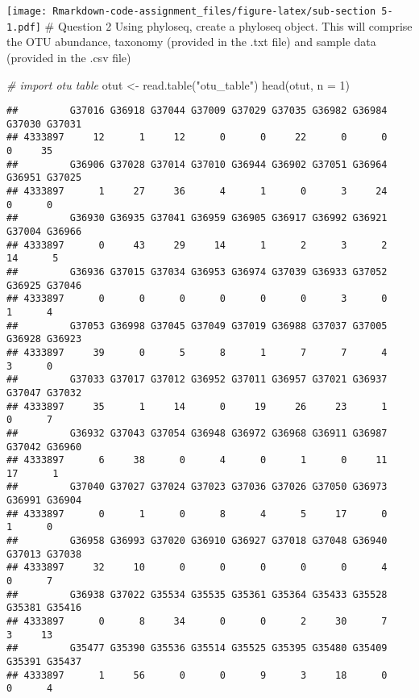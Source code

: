 \documentclass[
]{article}
\newenvironment{Shaded}{\begin{snugshade}}{\end{snugshade}}
\newcommand{\AttributeTok}[1]{\textcolor[rgb]{0.77,0.63,0.00}{#1}}
\newcommand{\CommentTok}[1]{\textcolor[rgb]{0.56,0.35,0.01}{\textit{#1}}}
\newcommand{\DecValTok}[1]{\textcolor[rgb]{0.00,0.00,0.81}{#1}}
\newcommand{\FunctionTok}[1]{\textcolor[rgb]{0.00,0.00,0.00}{#1}}
\newcommand{\NormalTok}[1]{#1}
\newcommand{\OtherTok}[1]{\textcolor[rgb]{0.56,0.35,0.01}{#1}}
\newcommand{\StringTok}[1]{\textcolor[rgb]{0.31,0.60,0.02}{#1}}
\begin{document}
\texttt{[image: Rmarkdown-code-assignment\_files/figure-latex/sub-section 5-1.pdf]}
\# Question 2 Using phyloseq, create a phyloseq object. This will
comprise the OTU abundance, taxonomy (provided in the .txt file) and
sample data (provided in the .csv file)

\begin{Shaded}
\begin{Highlighting}[]
\CommentTok{\# import otu table}
\NormalTok{otut }\OtherTok{\textless{}{-}} \FunctionTok{read.table}\NormalTok{(}\StringTok{"otu\_table"}\NormalTok{) }
\FunctionTok{head}\NormalTok{(otut, }\AttributeTok{n =} \DecValTok{1}\NormalTok{)}
\end{Highlighting}
\end{Shaded}

\begin{verbatim}
##         G37016 G36918 G37044 G37009 G37029 G37035 G36982 G36984 G37030 G37031
## 4333897     12      1     12      0      0     22      0      0      0     35
##         G36906 G37028 G37014 G37010 G36944 G36902 G37051 G36964 G36951 G37025
## 4333897      1     27     36      4      1      0      3     24      0      0
##         G36930 G36935 G37041 G36959 G36905 G36917 G36992 G36921 G37004 G36966
## 4333897      0     43     29     14      1      2      3      2     14      5
##         G36936 G37015 G37034 G36953 G36974 G37039 G36933 G37052 G36925 G37046
## 4333897      0      0      0      0      0      0      3      0      1      4
##         G37053 G36998 G37045 G37049 G37019 G36988 G37037 G37005 G36928 G36923
## 4333897     39      0      5      8      1      7      7      4      3      0
##         G37033 G37017 G37012 G36952 G37011 G36957 G37021 G36937 G37047 G37032
## 4333897     35      1     14      0     19     26     23      1      0      7
##         G36932 G37043 G37054 G36948 G36972 G36968 G36911 G36987 G37042 G36960
## 4333897      6     38      0      4      0      1      0     11     17      1
##         G37040 G37027 G37024 G37023 G37036 G37026 G37050 G36973 G36991 G36904
## 4333897      0      1      0      8      4      5     17      0      1      0
##         G36958 G36993 G37020 G36910 G36927 G37018 G37048 G36940 G37013 G37038
## 4333897     32     10      0      0      0      0      0      4      0      7
##         G36938 G37022 G35534 G35535 G35361 G35364 G35433 G35528 G35381 G35416
## 4333897      0      8     34      0      0      2     30      7      3     13
##         G35477 G35390 G35536 G35514 G35525 G35395 G35480 G35409 G35391 G35437
## 4333897      1     56      0      0      9      3     18      0      0      4

\end{verbatim}
\end{document}
